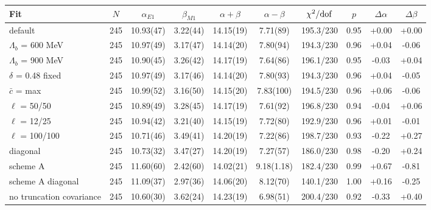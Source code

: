 \begin{tabular}{lccccccccc}
\hline
Fit & $N$ & $\alpha_{E1}$ & $\beta_{M1}$ & $\alpha+\beta$ & $\alpha-\beta$ & $\chi^2/{\rm dof}$ & $p$ & $\Delta\alpha$ & $\Delta\beta$ \\
\hline
default & 245 & 10.93(47) & 3.22(44) & 14.15(19) & 7.71(89) & 195.3/230 & 0.95 & +0.00 & +0.00 \\
$\Lambda_b$ = 600 MeV & 245 & 10.97(49) & 3.17(47) & 14.14(20) & 7.80(94) & 194.3/230 & 0.96 & +0.04 & -0.06 \\
$\Lambda_b$ = 900 MeV & 245 & 10.90(45) & 3.26(42) & 14.17(19) & 7.64(86) & 196.1/230 & 0.95 & -0.03 & +0.04 \\
$\delta$ = 0.48 fixed & 245 & 10.97(49) & 3.17(46) & 14.14(20) & 7.80(93) & 194.3/230 & 0.96 & +0.04 & -0.05 \\
$\bar c$ = max & 245 & 10.99(52) & 3.16(50) & 14.15(20) & 7.83(100) & 194.5/230 & 0.96 & +0.06 & -0.06 \\
$\ell$ = 50/50 & 245 & 10.89(49) & 3.28(45) & 14.17(19) & 7.61(92) & 196.8/230 & 0.94 & -0.04 & +0.06 \\
$\ell$ = 12/25 & 245 & 10.94(42) & 3.21(40) & 14.15(19) & 7.72(80) & 192.9/230 & 0.96 & +0.01 & -0.01 \\
$\ell$ = 100/100 & 245 & 10.71(46) & 3.49(41) & 14.20(19) & 7.22(86) & 198.7/230 & 0.93 & -0.22 & +0.27 \\
diagonal & 245 & 10.73(32) & 3.47(27) & 14.20(19) & 7.27(57) & 186.0/230 & 0.98 & -0.20 & +0.24 \\
scheme A & 245 & 11.60(60) & 2.42(60) & 14.02(21) & 9.18(1.18) & 182.4/230 & 0.99 & +0.67 & -0.81 \\
scheme A diagonal & 245 & 11.09(37) & 2.97(36) & 14.06(20) & 8.12(70) & 140.1/230 & 1.00 & +0.16 & -0.25 \\
no truncation covariance & 245 & 10.60(30) & 3.62(24) & 14.23(19) & 6.98(51) & 200.4/230 & 0.92 & -0.33 & +0.40 \\
\hline
\end{tabular}

